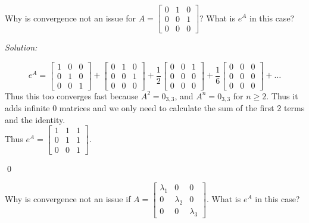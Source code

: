 \documentclass[11 pt]{article}
\newenvironment{problem}[2][Problem]{\begin{trivlist}
\item[\hskip \labelsep {\bfseries #1}\hskip \labelsep {\bfseries #2.}]}{\end{trivlist}}
\newenvironment{sol}
    {\emph{Solution:}
    }
    {
    \qed
    }
\theoremstyle{definition}
\begin{document}
\begin{problem}{M.2}
Why is convergence not an issue for $A=\begin{bmatrix}
0 & 1& 0\\ 0 & 0 & 1\\ 0 & 0 & 0
\end{bmatrix}$? What is $e^A$ in this case?
\end{problem}
\begin{sol}
\[e^A = \begin{bmatrix}
1 & 0 & 0\\0 & 1 & 0\\ 0 & 0 & 1
\end{bmatrix}+\begin{bmatrix}
0 & 1& 0\\ 0 & 0 & 1\\ 0 & 0 & 0
\end{bmatrix}+\frac{1}{2}\begin{bmatrix}
0 & 0 & 1 \\ 0 & 0 & 0\\ 0 & 0 & 0
\end{bmatrix}+\frac{1}{6}\begin{bmatrix}
0 & 0 & 0 \\ 0 & 0 & 0\\ 0 & 0  &0
\end{bmatrix}+\dots\]
Thus this too converges fast because $A^2=0_{3,3}$, and $A^n=0_{3,3}$ for $n\geq 2$. Thus it adds infinite 0 matrices and we only need to calculate the sum of the first 2 terms and the identity.\\
Thus $e^A=\begin{bmatrix}
1 & 1 & 1\\
0 & 1 & 1\\
0 & 0 & 1
\end{bmatrix}$.
\end{sol}
\begin{problem}{M.5}
Why is convergence not an issue if $A=\begin{bmatrix}
\lambda_1 & 0 & 0\\
0 & \lambda_2 & 0\\
0 & 0 & \lambda_3
\end{bmatrix}$. What is $e^A$ in this case?
\end{problem}
\end{document}
